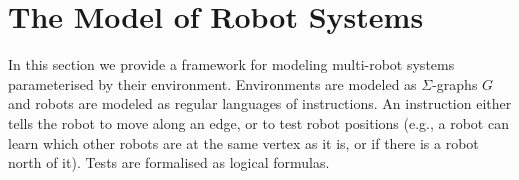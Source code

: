 \documentclass{llncs}
\def\nat{\mathbb{N}}
\newcommand{\sr}[1]{\footnote{{\color{red} Note. #1}}}
\renewcommand{\sr}[1]{}
\begin{document}


\vspace{-1mm}

\section{The Model of Robot Systems} \label{sec:model}
\vspace{-1mm}


In this section we provide a framework for modeling multi-robot systems parameterised by their environment.
Environments are modeled as $\Sigma$-graphs $G$ and robots are modeled as regular languages of instructions.
An instruction either tells the robot to move along an edge, or to test robot positions (e.g., a robot can learn which other robots are at the same vertex as it is, or if there is a robot north of it). Tests are formalised as logical formulas.
\end{document}
